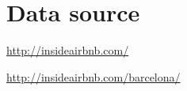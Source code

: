 

\section{Data source}%
\label{sec:data_source}

 \url{http://insideairbnb.com/}
 
 \url{http://insideairbnb.com/barcelona/}
